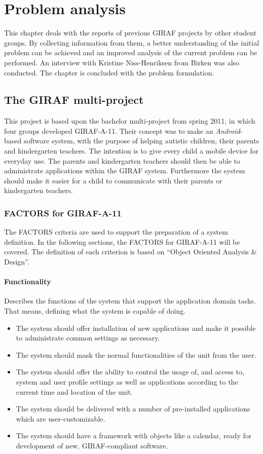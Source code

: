 \chapter{Problem analysis}
This chapter deals with the reports of previous GIRAF projects by other student groups. By collecting information from them, a better understanding of the initial problem can be achieved and an improved analysis of the current problem can be performed. An interview with Kristine Niss-Henriksen from Birken was also conducted. The chapter is concluded with the problem formulation.

\section{The GIRAF multi-project}
This project is based upon the bachelor multi-project from spring 2011, in which four groups developed GIRAF-A-11. Their concept was to make an \emph{Android}-based software system, with the purpose of helping autistic children, their parents and kindergarten teachers. The intention is to give every child a mobile device for everyday use. The parents and kindergarten teachers should then be able to administrate applications within the GIRAF system. Furthermore the system should make it easier for a child to communicate with their parents or kindergarten teachers. 

\subsection{FACTORS for GIRAF-A-11}
The FACTORS criteria are used to support the preparation of a system definition. In the following sections, the FACTORS for GIRAF-A-11 will be covered\cite{giraffactors}. The definition of each criterion is based on ``Object Oriented Analysis \& Design''\cite{OOAD}.

\subsubsection*{Functionality} 
Describes the functions of the system that support the application domain tasks. That means, defining what the system is capable of doing.
\begin{itemize}
	\item The system should offer installation of new applications and make it possible to administrate common settings as necessary.
	\item The system should mask the normal functionalities of the unit from the user.
	\item The system should offer the ability to control the usage of, and access to, system and user profile settings as well as applications according to the current time and location of the unit.
	\item The system should be delivered with a number of pre-installed applications which are user-customizable.
	\item The system should have a framework with objects like a calendar, ready for development of new, GIRAF-compliant software.
\end{itemize}

